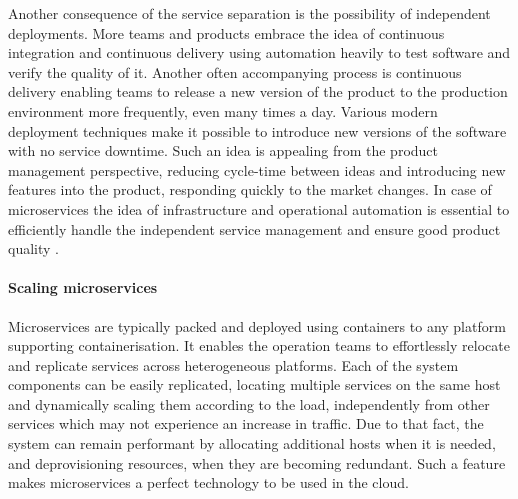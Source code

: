 Another consequence of the service separation is the possibility of independent deployments. More teams and products embrace the idea of continuous integration and continuous delivery using automation heavily to test software and verify the quality of it. Another often accompanying process is continuous delivery enabling teams to release a new version of the product to the production environment more frequently, even many times a day. Various modern deployment techniques make it possible to introduce new versions of the software with no service downtime. Such an idea is appealing from the product management perspective, reducing cycle-time between ideas and introducing new features into the product, responding quickly to the market changes. In case of microservices the idea of infrastructure and operational automation is essential to efficiently handle the independent service management and ensure good product quality \cite{FowlerMicroservicesTradeoffs}.

\paragraph{Scaling microservices}

Microservices are typically packed and deployed using containers to any platform supporting containerisation. It enables the operation teams to effortlessly relocate and replicate services across heterogeneous platforms. Each of the system components can be easily replicated, locating multiple services on the same host and dynamically scaling them according to the load, independently from other services which may not experience an increase in traffic. Due to that fact, the system can remain performant by allocating additional hosts when it is needed, and deprovisioning resources, when they are becoming redundant. Such a feature makes microservices a perfect technology to be used in the cloud.

